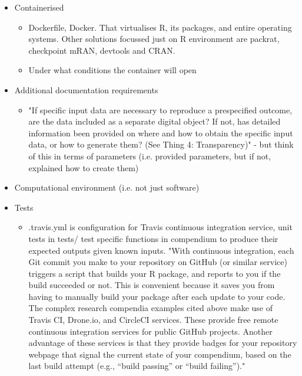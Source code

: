 \begin{itemize}
    \item Containerised
    \begin{itemize}
        \item Dockerfile, Docker. That virtualises R, its packages, and entire operating systems. Other solutions focussed just on R environment are packrat, checkpoint mRAN, devtools and CRAN. \autocite{marwick_packaging_2018}
        \item Under what conditions the container will open \autocite{arguillas_10_2022}
    \end{itemize}
    \item Additional documentation requirements\autocite{arguillas_10_2022}
    \begin{itemize}
        \item "If specific input data are necessary to reproduce a prespecified outcome, are the data included as a separate digital object? If not, has detailed information been provided on where and how to obtain the specific input data, or how to generate them? (See Thing 4: Transparency)" - but think of this in terms of parameters (i.e. provided parameters, but if not, explained how to create them) \autocite{arguillas_10_2022}
    \end{itemize}
    \item Computational environment (i.e. not just software)
    \item Tests
    \begin{itemize}
        \item .travis.yml is configuration for Travis continuous integration service, unit tests in tests/ test specific functions in compendium to produce their expected outputs given known inputs. "With continuous integration, each Git commit you make to your repository on GitHub (or similar service) triggers a script that builds your R package, and reports to you if the build succeeded or not. This is convenient because it saves you from having to manually build your package after each update to your code. The complex research compendia examples cited above make use of Travis CI, Drone.io, and CircleCI services. These provide free remote continuous integration services for public GitHub projects. Another advantage of these services is that they provide badges for your repository webpage that signal the current state of your compendium, based on the last build attempt (e.g., “build passing” or “build failing”)." \autocite{marwick_packaging_2018}
    \end{itemize}
\end{itemize}

